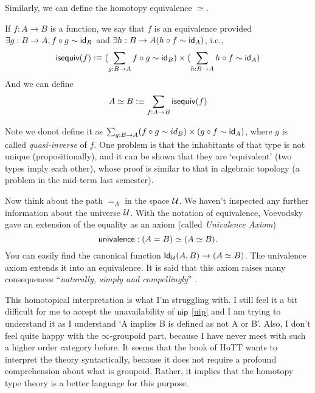 \newcommand{\isequiv}{\name{isequiv}}
Similarly, we can define the homotopy equivalence $\simeq$.
\begin{definition}
    If $f:A\to B$ is a function, we say that $f$ is an equivalence provided
    $\exists g:B\to A,f\circ g\sim \text{\sf id}_B$ and 
    $\exists h:B\to A(h\circ f\sim \text{\sf id}_A)$, i.e., 
    $$
        \isequiv(f)\defn(\sum_{g:B\to A}f\circ g\sim \id_B)\times
        (\sum_{h:B\to A}h\circ f\sim \id_A)
    $$
    And we can define
    $$
        A\simeq B\defn\sum_{f:A\to B}\isequiv(f)
    $$
\end{definition}

Note we donot define it as $\sum_{g:B\to A}(f\circ g\sim id_B)\times
(g\circ f\sim \text{\sf id}_A)$, where $g$ is called {\it quasi-inverse} of $f$.
One problem is that the inhabitants of that type is not unique 
(propositionally), and it can be shown that they are `equivalent' (two 
types imply each other), whose proof is similar to that in algebraic 
topology (a problem in the mid-term last semester). 

Now think about the path $=_A$ in the space $\mathcal{U}$. We haven't 
inspected any further information about the universe $\mathcal{U}$.
With the notation of equivalence, Voevodsky gave an extension of the
equality as an axiom (called {\it Univalence Axiom})
\newcommand{\univalence}{\name{univalence}}
$$
    \univalence: (A=B)\simeq(A\simeq B).
$$
You can easily find the canonical function $\text{\sf Id}_{\mathcal{U}}(A,B)\to(A\simeq B)$. 
The univalence axiom extends it into an equivalence. It is said that this
axiom raises many consequences ``{\it naturally, simply and compellingly}''
\cite{homotopy-type-theory}. 

This homotopical interpretation is what I'm struggling with. I still
feel it a bit difficult for me to accept the unavailability of $\text{\sf uip}$
\eqref{uip} and I am trying to understand it as I understand `A implies B
is defined as not A or B'. Also, I don't feel quite happy with the
$\infty$-groupoid part, because I have never meet with such a higher
order category before. It seems that the book of HoTT\cite{homotopy-type-theory} 
wants to interpret the theory syntactically, because it does not require a 
profound comprehension about what is groupoid. Rather, it implies that the
homotopy type theory is a better language for this purpose. 

